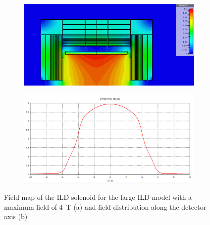 \begin{figure}[t]
\begin{center}
\begin{subfigure}{0.9\hsize} \includegraphics[width=\textwidth]{Integration/fig/field_nominal_4.png}
\caption{ \label{ild:fig:magnet_nominal_map}}
 \end{subfigure}
\hspace{0.03\textwidth}
\begin{subfigure}{0.9\hsize} \includegraphics[width=\textwidth]{Integration/fig/field_nominal_4_plot.png}
\caption{  \label{ild:fig:magnet_nominal_field}}
 \end{subfigure}
\end{center}
\caption{Field map of the ILD solenoid for the large ILD model with a maximum field of 4~T (a) and field distribution along the detector axis (b)~\cite{ild:bib:Magnet_Simulations}}
\label{ILD:fig:magnet_nominal}
\end{figure}

